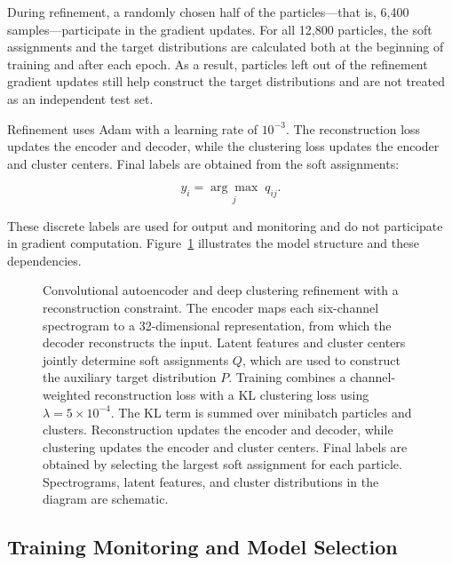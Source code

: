 During refinement, a randomly chosen half of the particles---that is, 6,400 samples---participate in the gradient updates. For all 12,800 particles, the soft assignments and the target distributions are calculated both at the beginning of training and after each epoch. As a result, particles left out of the refinement gradient updates still help construct the target distributions and are not treated as an independent test set.

Refinement uses Adam with a learning rate of \(10^{-3}\). The reconstruction loss updates the encoder and decoder, while the clustering loss updates the encoder and cluster centers. Final labels are obtained from the soft assignments:

\begin{equation} y_i=\underset{j}{\arg\max}\;q_{ij}. \end{equation}

These discrete labels are used for output and monitoring and do not participate in gradient computation. Figure~\ref{fig:architecture} illustrates the model structure and these dependencies.

\begin{figure}[htbp]
\centering
{}
\caption[Convolutional autoencoder and reconstruction-constrained deep clustering]{Convolutional autoencoder and deep clustering refinement with a reconstruction constraint. The encoder maps each six-channel spectrogram to a 32-dimensional representation, from which the decoder reconstructs the input. Latent features and cluster centers jointly determine soft assignments \(Q\), which are used to construct the auxiliary target distribution \(P\). Training combines a channel-weighted reconstruction loss with a KL clustering loss using \(\lambda=5\times10^{-4}\). The KL term is summed over minibatch particles and clusters. Reconstruction updates the encoder and decoder, while clustering updates the encoder and cluster centers. Final labels are obtained by selecting the largest soft assignment for each particle. Spectrograms, latent features, and cluster distributions in the diagram are schematic.}\label{fig:architecture}
\end{figure}

\subsection{Training Monitoring and Model Selection}


